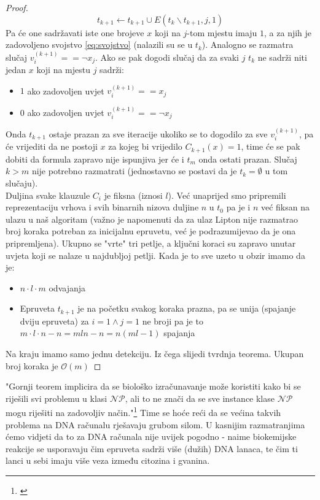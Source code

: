 \documentclass[12pt, a4paper]{book}
\begin{document}
\begin{spacing}{1.5}
\begin{proof}
\[t_{k+1} \leftarrow t_{k+1} \cup E(t_{k}\backslash t_{k+1},j,1)\]
Pa će one sadržavati iste one brojeve $x$ koji na $j$-tom mjestu imaju $1$, a za njih je zadovoljeno svojstvo \ref{eq:svojstvo} (nalazili su se u $t_k$). Analogno se razmatra slučaj $v_i ^{(k+1)}==\neg x_j$. Ako se pak dogodi slučaj da za svaki $j$ $t_k$ ne sadrži niti jedan $x$ koji na mjestu $j$ sadrži: 
\begin{itemize}
\item $1$ ako zadovoljen uvjet $v_i^{(k+1)}==x_j$
\item $0$ ako zadovoljen uvjet $v_i^{(k+1)}==\neg x_j$
\end{itemize} 
Onda $t_{k+1}$ ostaje prazan za sve iteracije ukoliko se to dogodilo za sve $v_i^{(k+1)}$, pa će vrijediti da ne postoji $x$ za kojeg bi vrijedilo $C_{k+1}(x)=1$, time će se pak dobiti da formula zapravo nije ispunjiva jer će i $t_{m}$ onda ostati prazan. Slučaj $k>m$ nije potrebno razmatrati (jednostavno se postavi da je $t_k=\emptyset$ u tom slučaju). \\
Duljina svake klauzule $C_i$ je fiksna (iznosi $l$). Već unaprijed smo pripremili reprezentaciju vrhova i svih binarnih nizova duljine $n$ u $t_0$ pa je i $n$ već fiksan na ulazu u naš algoritam (važno je napomenuti da za ulaz Lipton nije razmatrao broj koraka potreban za inicijalnu epruvetu, već je podrazumijevao da je ona pripremljena). Ukupno se "vrte" tri petlje, a ključni koraci su zapravo unutar uvjeta koji se nalaze u najdubljoj petlji. Kada je to sve uzeto u obzir imamo da je:
\begin{itemize}
	\item $n \cdot l \cdot m$ odvajanja
	\item Epruveta $t_{k+1}$ je na početku svakog koraka prazna, pa se unija (spajanje dviju epruveta) za $i=1 \wedge j=1$ ne broji pa je to $m \cdot l \cdot n - n=mln-n=n(ml-1)$ spajanja
\end{itemize}
Na kraju imamo samo jednu detekciju. Iz čega slijedi tvrdnja teorema. Ukupan broj koraka je $\mathcal{O}(m)$   
\end{proof}
"Gornji teorem implicira da se biološko izračunavanje može koristiti kako bi se riješili svi problemu u klasi $\mathcal{NP}$, ali to ne znači da se sve instance klase $\mathcal{NP}$ mogu riješiti na zadovoljiv način."\footnote{\cite[str. ~407]{CNTYan}} Time se hoće reći da se većina takvih problema na DNA računalu rješavaju grubom silom. U kasnijim razmatranjima ćemo vidjeti da to za DNA računala nije uvijek pogodno - naime biokemijske reakcije se usporavaju čim epruveta sadrži više (dužih) DNA lanaca, te čim ti lanci u sebi imaju više veza između citozina i gvanina.   

\end{spacing}
\end{document}

